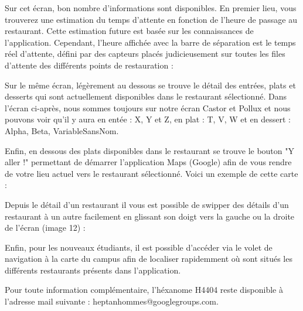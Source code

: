 Sur cet écran, bon nombre d’informations sont disponibles. En premier lieu,
vous trouverez une estimation du temps d’attente en fonction de l’heure de
passage au restaurant. Cette estimation future est basée sur les connaissances
de l’application. Cependant, l’heure affichée avec la barre de séparation est le
temps réel d’attente, défini par des capteurs placés judicieusement sur toutes
les files d’attente des différents points de restauration : 

Sur le même écran, légèrement au dessous se trouve le détail des entrées,
plats et desserts qui sont actuellement disponibles dans le restaurant
sélectionné. Dans l’écran ci-après, nous sommes toujours sur
notre écran Castor et Pollux et nous pouvons voir qu’il y aura en entée : 
X, Y et Z, en plat : T, V, W et en dessert : Alpha, Beta, VariableSansNom. 

Enfin, en dessous des plats disponibles dans le restaurant se trouve le
bouton "Y aller !" permettant de démarrer l’application Maps (Google) afin de
vous rendre de votre lieu actuel vers le restaurant sélectionné. Voici un exemple
de cette carte :

Depuis le détail d’un restaurant il vous est possible de swipper des 
détails d’un restaurant à un autre facilement en glissant son doigt vers la
gauche ou la droite de l’écran (image 12) : 

Enfin, pour les nouveaux étudiants, il est possible d'accéder via le volet de navigation
à la carte du campus afin de localiser rapidemment où sont situés les différents
restaurants présents dans l'application.

Pour toute information complémentaire, l’héxanome H4404 reste disponible
à l’adresse mail suivante : heptanhommes@googlegroups.com. 